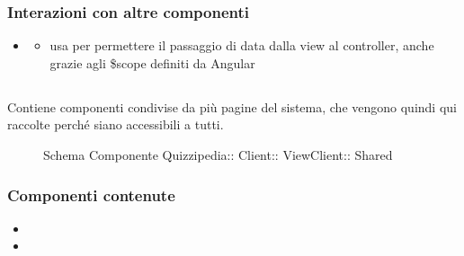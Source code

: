 \subsubsection{Interazioni con altre componenti}
\begin{itemize}
\item {}
\begin{itemize}
\item usa  per permettere il passaggio di data dalla view al controller, anche grazie agli \$scope definiti da Angular
\end{itemize}
\end{itemize}
\subsection{}
Contiene componenti condivise da più pagine del sistema, che vengono quindi qui raccolte perché siano accessibili a tutti.
\begin{figure}[H]
\centering
\noindent{}
\caption[Schema Componente Shared]{Schema Componente Quizzipedia:: Client:: ViewClient:: Shared}
\end{figure}
\subsubsection{Componenti contenute}
\begin{itemize}
\item {}
\item {}
\end{itemize}

